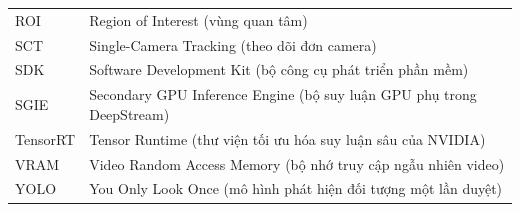 \begin{table}[H]
\begin{tabular}{p{3.2cm} p{13cm}}
ROI      & Region of Interest (vùng quan tâm) \\
SCT      & Single-Camera Tracking (theo dõi đơn camera) \\
SDK      & Software Development Kit (bộ công cụ phát triển phần mềm) \\
SGIE     & Secondary GPU Inference Engine (bộ suy luận GPU phụ trong DeepStream) \\
TensorRT & Tensor Runtime (thư viện tối ưu hóa suy luận sâu của NVIDIA) \\
VRAM     & Video Random Access Memory (bộ nhớ truy cập ngẫu nhiên video) \\
YOLO     & You Only Look Once (mô hình phát hiện đối tượng một lần duyệt) \\
\bottomrule
\end{tabular}
\end{table}

\newpage
